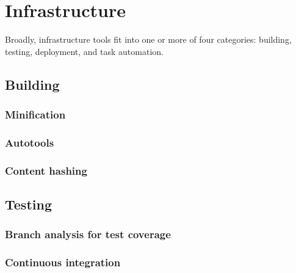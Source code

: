 \chapter{Infrastructure}




Broadly, infrastructure tools fit into one or more of four categories:
building, testing, deployment, and task automation.

\lipsum[1]

\section{Building}

\lipsum[11]

\subsection{Minification}
\subsection{Autotools}
\subsection{Content hashing}

\section{Testing}

\lipsum[13-14]

\subsection{Branch analysis for test coverage}

\lipsum[12-16]


\subsection{Continuous integration}

